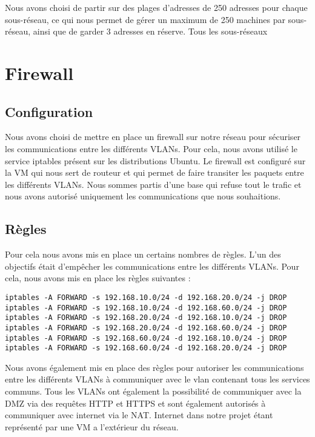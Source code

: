 \documentclass[a4paper,12pt]{report}
\begin{document}
                Nous avons choisi de partir sur des plages d'adresses de 250 adresses pour chaque sous-réseau, ce qui nous permet de gérer un maximum de 250 machines par sous-réseau, ainsi que de garder 3 adresses en réserve.
                Tous les sous-réseaux 



        \section{Firewall}
            \subsection{Configuration}
            Nous avons choisi de mettre en place un firewall sur notre réseau pour sécuriser les communications entre les différents VLANs. Pour cela, nous avons utilisé le service iptables présent sur les distributions Ubuntu.
            Le firewall est configuré sur la VM qui nous sert de routeur et qui permet de faire transiter les paquets entre les différents VLANs. Nous sommes partis d'une base qui refuse tout le trafic et nous avons autorisé uniquement les communications que nous souhaitions.

            \subsection{Règles}
            Pour cela nous avons mis en place un certains nombres de règles. L'un des objectifs était d'empêcher les communications entre les différents VLANs. Pour cela, nous avons mis en place les règles suivantes :
            \begin{verbatim}
iptables -A FORWARD -s 192.168.10.0/24 -d 192.168.20.0/24 -j DROP
iptables -A FORWARD -s 192.168.10.0/24 -d 192.168.60.0/24 -j DROP
iptables -A FORWARD -s 192.168.20.0/24 -d 192.168.10.0/24 -j DROP
iptables -A FORWARD -s 192.168.20.0/24 -d 192.168.60.0/24 -j DROP
iptables -A FORWARD -s 192.168.60.0/24 -d 192.168.10.0/24 -j DROP
iptables -A FORWARD -s 192.168.60.0/24 -d 192.168.20.0/24 -j DROP
            \end{verbatim}
            Nous avons également mis en place des règles pour autoriser les communications entre les différents VLANs à communiquer avec le vlan contenant tous les services communs. Tous les VLANs ont également la possibilité de communiquer avec la DMZ via des requêtes HTTP et HTTPS et sont également autorisés à communiquer avec internet via le NAT. Internet dans notre projet étant représenté par une VM a l'extérieur du réseau. 
\end{document}
